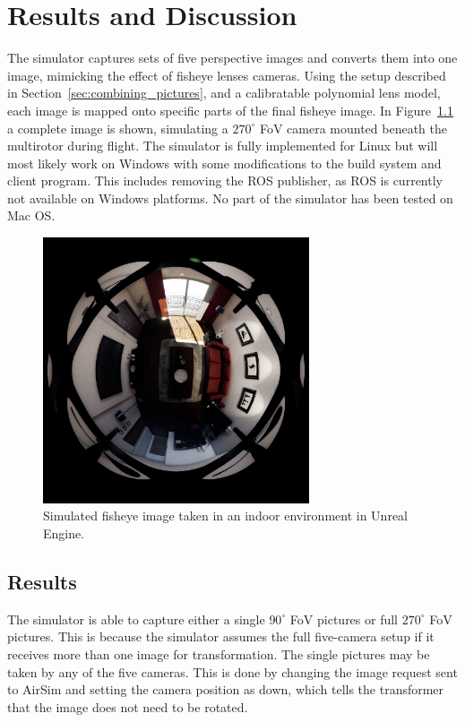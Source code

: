 
\chapter{Results and Discussion}

The simulator captures sets of five perspective images and converts them into one image, mimicking the effect of fisheye lenses cameras. Using the setup described in Section~\ref{sec:combining_pictures}, and a calibratable polynomial lens model, each image is mapped onto specific parts of the final fisheye image. In Figure~\ref{fig:res_show_fisheye} a complete image is shown, simulating a $270^\circ$ FoV camera mounted beneath the multirotor during flight. The simulator is fully implemented for Linux but will most likely work on Windows with some modifications to the build system and client program. This includes removing the ROS publisher, as ROS is currently not available on Windows platforms. No part of the simulator has been tested on Mac OS. 

\begin{figure}[!htb]
    \centering
    \includegraphics[width=0.7\textwidth]{rapport/fig/Results/1024to1024.jpeg}
    \caption{Simulated fisheye image taken in an indoor environment in Unreal Engine.}
    \label{fig:res_show_fisheye}
\end{figure}

\section{Results} \label{sec:Results}

The simulator is able to capture either a single $90^\circ$ FoV pictures or full $270^\circ$ FoV pictures. This is because the simulator assumes the full five-camera setup if it receives more than one image for transformation. The single pictures may be taken by any of the five cameras. This is done by changing the image request sent to AirSim and setting the camera position as down, which tells the transformer that the image does not need to be rotated.

